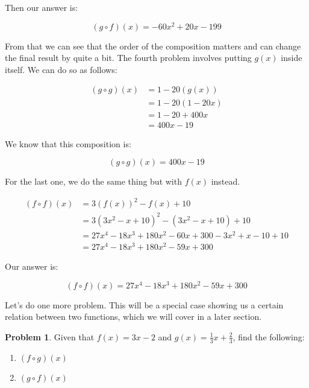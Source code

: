 \documentclass[12pt]{article}
\theoremstyle{definition}
\newtheorem{problem}{Problem}
\begin{document}
Then our answer is:

\begin{equation}
    (g \circ f)(x) = -60x^2 + 20x - 199
\end{equation}

From that we can see that the order of the composition matters and can change the final result by quite a bit.
The fourth problem involves putting $g(x)$ inside itself.
We can do so as follows:

\begin{align}
    (g \circ g)(x) & = 1 - 20(g(x))    \\
                   & = 1 - 20(1 - 20x) \\
                   & = 1 - 20 + 400x   \\
                   & = 400x - 19
\end{align}

We know that this composition is:

\begin{equation}
    (g \circ g)(x) = 400x - 19
\end{equation}

For the last one, we do the same thing but with $f(x)$ instead.

\begin{align}
    (f \circ f)(x) & = 3(f(x))^2 - f(x) + 10                                   \\
                   & = 3(3x^2 - x + 10)^2 - (3x^2 - x + 10) + 10               \\
                   & = 27x^4 - 18x^3 + 180x^2 - 60x + 300 - 3x^2 + x - 10 + 10 \\
                   & = 27x^4 - 18x^3 + 180x^2 - 59x + 300
\end{align}

Our answer is:

\begin{equation}
    (f \circ f)(x) = 27x^4 - 18x^3 + 180x^2 - 59x + 300
\end{equation}

Let's do one more problem.
This will be a special case showing us a certain relation between two functions, which we will cover in a later section.

\begin{problem}
Given that $f(x) = 3x - 2$ and $g(x) = \frac{1}{3}x + \frac{2}{3}$, find the following:

\begin{enumerate}
    \item $(f \circ g)(x)$
    \item $(g \circ f)(x)$
\end{enumerate}
\end{problem}
\end{document}

